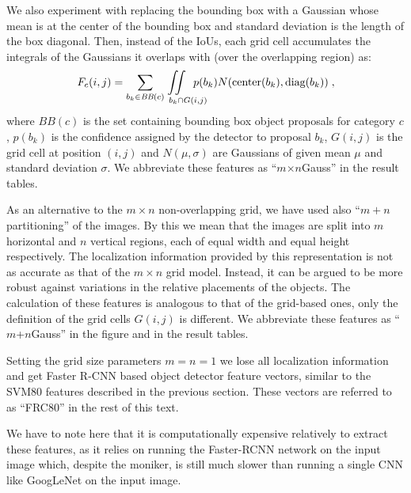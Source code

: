 We also experiment with replacing the bounding box with a Gaussian whose mean is
at the center of the bounding box and standard deviation is the length of the
box diagonal.
Then, instead of the IoUs, each grid cell accumulates the integrals of the
Gaussians it overlaps with (over the overlapping region) as:
\begin{equation} \label{eqn:Gauss} F_c(i,j) = \sum_{b_k \in \text{\it
        BB}(c)}\text{\hspace*{-7mm}} \iint\displaylimits_%
{\text{\hspace{9mm}}b_k \cap G(i,j)}\text{\hspace*{-5mm}}
p(b_k)N(\text{center}(b_k),\text{diag}(b_k)) \; , \end{equation}
\noindent where $BB(c)$ is the set containing bounding box object proposals for
category $c$, $p(b_k)$ is the confidence assigned by the detector to proposal
$b_k$, $G(i,j)$ is the grid cell at position $(i,j)$ and $N(\mu,\sigma)$ are
Gaussians of given mean $\mu$ and standard deviation $\sigma$.
We abbreviate these features as ``$m$$\times${}$n$Gauss'' in the result tables.

As an alternative to the $m\times n$ non-overlapping grid, we have used also
``$m+n$ partitioning'' of the images.
By this we mean that the images are split into $m$ horizontal and $n$ vertical
regions, each of equal width and equal height respectively.
The localization information provided by this representation is not as accurate
as that of the $m\times n$ grid model.
Instead, it can be argued to be more robust against variations in the relative
placements of the objects.
The calculation of these features is analogous to that of the grid-based ones,
only the definition of the grid cells $G(i,j)$ is different.
We abbreviate these features as ``$m$+$n$Gauss'' in the figure and in the result
tables.

Setting the grid size parameters $m=n=1$ we lose all localization information
and get Faster R-CNN based object detector feature vectors, similar to the SVM80
features described in the previous section.
These vectors are referred to as ``FRC80'' in the rest of this text. 

We have to note here that it is computationally expensive relatively to extract
these features, as it relies on running the Faster-RCNN network on the input
image which, despite the moniker, is still much slower than running a single CNN
like GoogLeNet on the input image.

